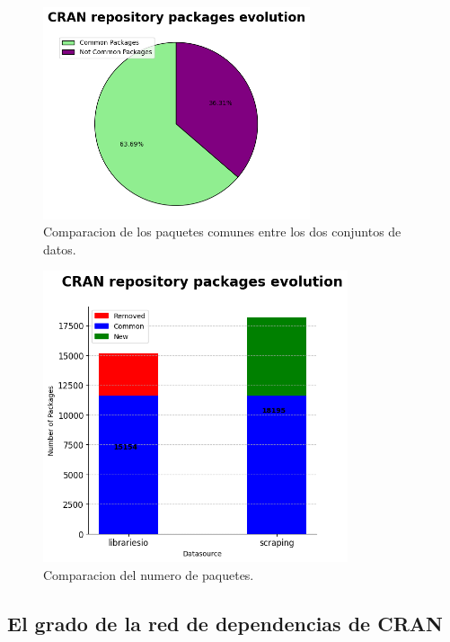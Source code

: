\begin{figure}[h!]
    \begin{center}
        \includegraphics[width=0.7\textwidth]{img/cran/circle.png}
        \caption{Comparacion de los paquetes comunes entre los dos conjuntos de datos.}
        \label{fig:cran_common_packages2}
    \end{center}
\end{figure}

\begin{figure}[h!]
    \begin{center}
        \includegraphics[width=0.8\textwidth]{img/cran/bars.png}
        \caption{Comparacion del numero de paquetes.}
        \label{fig:cran_common_packages3}
    \end{center}
\end{figure}

\subsection{El grado de la red de dependencias de CRAN}

